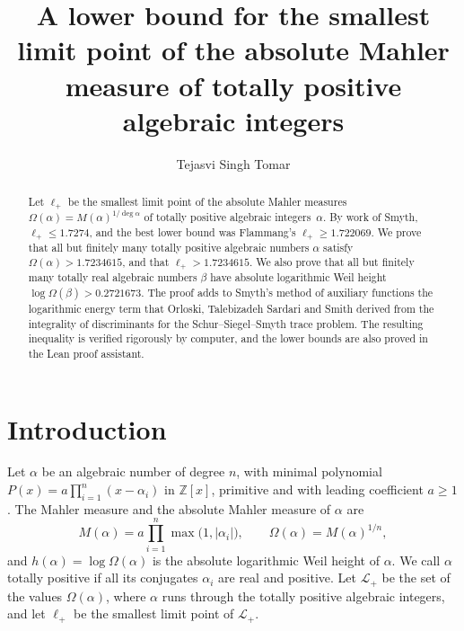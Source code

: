 \documentclass[11pt]{amsart}
\theoremstyle{remark}
\numberwithin{equation}{section}
\newcommand{\Z}{\mathbb{Z}}
\newcommand{\EMzero}{1.7234615}
\newcommand{\HalfM}{0.2721673}
\newcommand{\FlamVal}{1.722069}
\newcommand{\SmyEllUp}{1.7274}
\begin{document}
\title[Totally positive algebraic integers]{A lower bound for the smallest limit point of the absolute Mahler measure of totally positive algebraic integers}
\author{Tejasvi Singh Tomar}
\renewcommand{\urladdrname}{{\itshape ORCID}}

\begin{abstract}
Let $\ell_+$ be the smallest limit point of the absolute Mahler measures $\Omega(\alpha)=M(\alpha)^{1/\deg\alpha}$ of totally positive algebraic integers~$\alpha$. By work of Smyth, $\ell_+\le\SmyEllUp$, and the best lower bound was Flammang's $\ell_+\ge\FlamVal$. We prove that all but finitely many totally positive algebraic numbers $\alpha$ satisfy $\Omega(\alpha)>\EMzero$, and that $\ell_+>\EMzero$. We also prove that all but finitely many totally real algebraic numbers $\beta$ have absolute logarithmic Weil height $\log\Omega(\beta)>\HalfM$. The proof adds to Smyth's method of auxiliary functions the logarithmic energy term that Orloski, Talebizadeh Sardari and Smith derived from the integrality of discriminants for the Schur--Siegel--Smyth trace problem. The resulting inequality is verified rigorously by computer, and the lower bounds are also proved in the Lean proof assistant.
\end{abstract}

\maketitle

\section{Introduction}\label{sec:intro}

Let $\alpha$ be an algebraic number of degree $n$, with minimal polynomial $P(x)=a\prod_{i=1}^n(x-\alpha_i)$ in $\Z[x]$, primitive and with leading coefficient $a\ge1$. The Mahler measure and the absolute Mahler measure of $\alpha$ are
\[
M(\alpha)=a\prod_{i=1}^n\max\bigl(1,|\alpha_i|\bigr),\qquad \Omega(\alpha)=M(\alpha)^{1/n},
\]
and $h(\alpha)=\log\Omega(\alpha)$ is the absolute logarithmic Weil height of $\alpha$. We call $\alpha$ totally positive if all its conjugates $\alpha_i$ are real and positive. Let $\mathcal L_+$ be the set of the values $\Omega(\alpha)$, where $\alpha$ runs through the totally positive algebraic integers, and let $\ell_+$ be the smallest limit point of $\mathcal L_+$.
\end{document}
